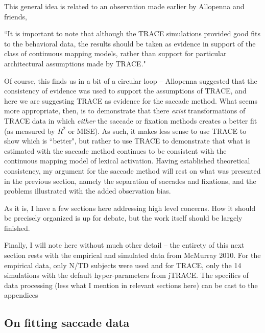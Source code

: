 This general idea is related to an observation made earlier by Allopenna and friends, 

``It is important to note that although the TRACE simulations provided good fits to the behavioral data, the results should be taken as evidence in support of the class of continuous mapping models, rather than support for particular architectural assumptions made by TRACE."

Of course, this finds us in a bit of a circular loop -- Allopenna suggested that the consistency of evidence was used to support the assumptions of TRACE, and here we are suggesting TRACE as evidence for the saccade method. What seems more appropriate, then, is to demonstrate that there \textit{exist} transformations of TRACE data in which \textit{either} the saccade or fixation methods creates a better fit (as measured by $R^2$ or MISE). As such, it makes less sense to use TRACE to show which is ``better", but rather to use TRACE to demonstrate that what is estimated with the saccade method continues to be consistent with the continuous mapping model of lexical activation. Having established theoretical consistency, my argument for the saccade method will rest on what was presented in the previous section, namely the separation of saccades and fixations, and the problems illustrated with the added observation bias. 

As it is, I have a few sections here addressing high level concerns. How it should be precisely organized is up for debate, but the work itself should be largely finished.

Finally, I will note here without much other detail -- the entirety of this next section rests with the empirical and simulated data from McMurray 2010. For the empirical data, only N/TD subjects were used and for TRACE, only the 14 simulations with the default hyper-parameters from jTRACE. The specifics of data processing (less what I mention in relevant sections here) can be cast to the appendices

\subsection{On fitting saccade data}


